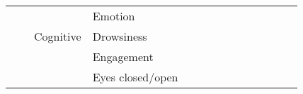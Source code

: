 \begin{tabular}{p{1.5cm}p{1.5cm}p{1.5cm}p{1.5cm}p{0.6cm}p{0.6cm}p{0.6cm}p{0.6cm}p{0.6cm}p{0.6cm}p{0.6cm}p{0.6cm}p{0.6cm}p{0.6cm}}
                                &                 &                   & Emotion &  \cite{BenSaid2017a, Xu2016, Liu2016, Jirayucharoensak2014} &                                                                                                    \cite{Liao2018, Lin2017} &                                                                        &  \cite{Zheng2015, Zheng2014, Li2013} &                   \cite{Teo2018, Kwon2017, Frydenlund2015} &                      &    \cite{Mehmood2017} &                                 &          \cite{Gao2015} &                                \cite{Li2018, Zhang2018, Alhagry2017} \\
                                &                 & Cognitive & Drowsiness &                                                             &                                                                                                                             &                                                                        &                                      &                                                            &                      &                       &                                 &  \cite{Hajinoroozi2015} &                                                                      \\
                                &                 &                   & Engagement &                                                             &                                                                                                                             &                                                                        &                                      &                                                            &                      &                       &                                 &           \cite{Li2017} &                                                                      \\
                                &                 &                   & Eyes closed/open &                                                             &                                                                                                                             &                                                                        &                    \cite{Narejo2016} &                                                            &                      &                       &                                 &                         &                                                                      \\

\end{tabular}
